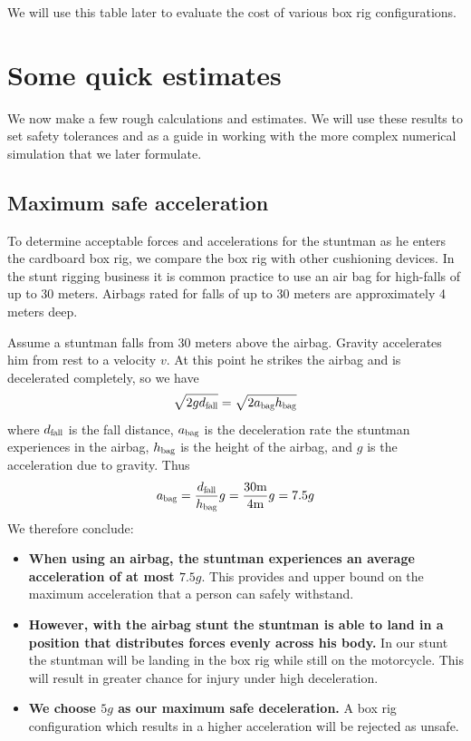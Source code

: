 \documentclass[12pt,a4paper,titlepage]{article}
\begin{document}
We will use this table later to evaluate the cost of various box rig configurations.

\section{Some quick estimates}

We now make a few rough calculations and estimates.  We will use these results to set safety
tolerances and as a guide in working with the more complex numerical simulation that we later formulate.

\subsection{Maximum safe acceleration}

To determine acceptable forces and accelerations for the stuntman as he enters the cardboard box rig,
we compare the box rig with other cushioning devices. In the stunt rigging business it is common practice to use an
air bag for high-falls of up to 30 meters.  Airbags rated for falls of up to 30 meters are approximately 4 meters deep.

Assume a stuntman falls from 30 meters above the airbag.  Gravity accelerates him from rest to a velocity $v$.  At this
point he strikes the airbag and is decelerated completely, so we have
$$
\sqrt{2 g d_{\scalebox{0.7}{\hbox{fall}}}}=\sqrt{2 a_{\scalebox{0.7}{\hbox{bag}}} h_{\scalebox{0.7}{\hbox{bag}}}}
$$
where $d_{\scalebox{0.7}{\hbox{fall}}}$ is the fall distance, $a_{\scalebox{0.7}{\hbox{bag}}}$ is the deceleration rate the
stuntman experiences in the airbag, $h_{\scalebox{0.7}{\hbox{bag}}}$ is the height of the airbag, and $g$ is the acceleration due to gravity. Thus
$$
a_{\scalebox{0.7}{\hbox{bag}}} = \frac{d_{\scalebox{0.7}{\hbox{fall}}}}{h_{\scalebox{0.7}{\hbox{bag}}}}g = \frac{30 \hbox{m}}{4 \hbox{m}}g = 7.5 g
$$
We therefore conclude:

\begin{itemize}
\item {\bf When using an airbag, the stuntman experiences an average acceleration of at most $7.5 g$}.  This
provides and upper bound on the maximum acceleration that a person can safely withstand.
\item {\bf However, with the airbag stunt the stuntman is able to land in a position that distributes forces evenly across his body.}  In our stunt
the stuntman will be landing in the box rig while still on the motorcycle.  This will result in greater chance for injury under high deceleration.
\item {\bf We choose $5 g$ as our maximum safe deceleration.} A box rig configuration which results in a higher acceleration will be rejected as unsafe.

\end{itemize}
\end{document}

